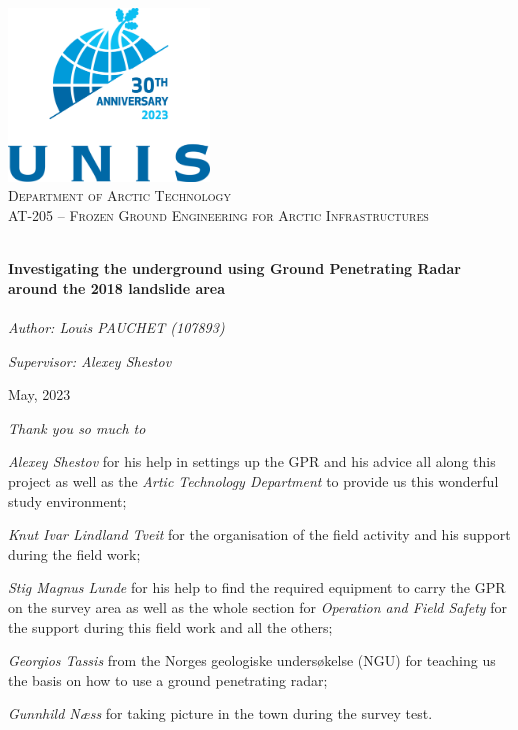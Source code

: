 \begin{titlepage}
\vbox{}
\vbox{}
\begin{center}
\includegraphics[width=0.40\textwidth]{Images/UNIS_logo.png}\\[2cm]
\textsc{\LARGE Department of Arctic Technology}\\[1.5cm]
\textsc{\Large AT-205 -- Frozen Ground Engineering for Arctic Infrastructures}\\[0.5cm]
\vbox{}

\HRule \\[0.5cm]
{ \huge \bfseries Investigating the underground using Ground Penetrating Radar around the 2018 landslide area }\\[0.5cm]
\HRule \\[1.5cm]

\large
\emph{Author: Louis PAUCHET (107893)} 

\emph{Supervisor: Alexey Shestov} 

\vspace{2.5cm}

{\large May, 2023}

\vfill


\end{center}

\doclicenseThis

\end{titlepage}

\newpage

\vspace*{\fill}
\begin{center}
    \huge \emph{Thank you so much to}
\end{center}

\emph{Alexey Shestov} for his help in settings up the GPR and his advice all along this project as well as the \emph{Artic Technology Department} to provide us this wonderful study environment;

\emph{Knut Ivar Lindland Tveit} for the organisation of the field activity and his support during the field work;

\emph{Stig Magnus Lunde} for his help to find the required equipment to carry the GPR on the survey area as well as the whole section for \emph{Operation and Field Safety} for the support during this field work and all the others;

\emph{Georgios Tassis} from the Norges geologiske undersøkelse (NGU) for teaching us the basis on how to use a ground penetrating radar;

\emph{Gunnhild Næss} for taking picture in the town during the survey test.
\vspace*{\fill}

\newpage